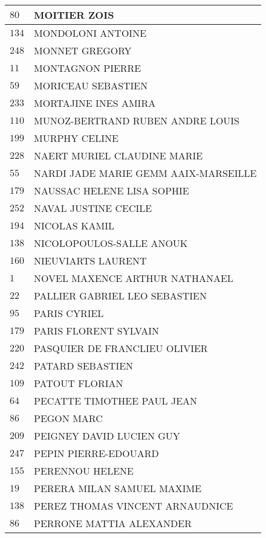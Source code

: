 \begin{xltabular}{\linewidth}{|l|X|}
    \hline
    $80$ & MOITIER ZOIS \\
    \hline
    $134$ & MONDOLONI ANTOINE \\
    \hline
    $248$ & MONNET GREGORY \\
    \hline
    $11$ & MONTAGNON PIERRE \\
    \hline
    $59$ & MORICEAU SEBASTIEN \\
    \hline
    $233$ & MORTAJINE INES AMIRA \\
    \hline
    $110$ & MUNOZ-BERTRAND RUBEN ANDRE LOUIS \\
    \hline
    $199$ & MURPHY CELINE \\
    \hline
    $228$ & NAERT MURIEL CLAUDINE MARIE \\
    \hline
    $55$ & NARDI JADE MARIE GEMM AAIX-MARSEILLE \\
    \hline
    $179$ & NAUSSAC HELENE LISA SOPHIE \\
    \hline
    $252$ & NAVAL JUSTINE CECILE \\
    \hline
    $194$ & NICOLAS KAMIL \\
    \hline
    $138$ & NICOLOPOULOS-SALLE ANOUK \\
    \hline
    $160$ & NIEUVIARTS LAURENT \\
    \hline
    $1$ & NOVEL MAXENCE ARTHUR NATHANAEL \\
    \hline
    $22$ & PALLIER GABRIEL LEO SEBASTIEN \\
    \hline
    $95$ & PARIS CYRIEL \\
    \hline
    $179$ & PARIS FLORENT SYLVAIN \\
    \hline
    $220$ & PASQUIER DE FRANCLIEU OLIVIER \\
    \hline
    $242$ & PATARD SEBASTIEN \\
    \hline
    $109$ & PATOUT FLORIAN \\
    \hline
    $64$ & PECATTE TIMOTHEE PAUL JEAN \\
    \hline
    $86$ & PEGON MARC \\
    \hline
    $209$ & PEIGNEY DAVID LUCIEN GUY \\
    \hline
    $247$ & PEPIN PIERRE-EDOUARD \\
    \hline
    $155$ & PERENNOU HELENE \\
    \hline
    $19$ & PERERA MILAN SAMUEL MAXIME \\
    \hline
    $138$ & PEREZ THOMAS VINCENT ARNAUDNICE \\
    \hline
    $86$ & PERRONE MATTIA ALEXANDER \\

\end{xltabular}
